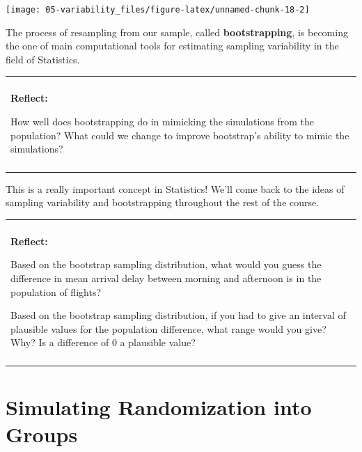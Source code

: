 \documentclass[
]{book}
\newenvironment{Shaded}{\begin{snugshade}}{\end{snugshade}}
\newcommand{\CharTok}[1]{\textcolor[rgb]{0.31,0.60,0.02}{#1}}
\newcommand{\CommentTok}[1]{\textcolor[rgb]{0.56,0.35,0.01}{\textit{#1}}}
\newcommand{\DataTypeTok}[1]{\textcolor[rgb]{0.13,0.29,0.53}{#1}}
\newcommand{\DecValTok}[1]{\textcolor[rgb]{0.00,0.00,0.81}{#1}}
\newcommand{\KeywordTok}[1]{\textcolor[rgb]{0.13,0.29,0.53}{\textbf{#1}}}
\newcommand{\NormalTok}[1]{#1}
\newcommand{\OperatorTok}[1]{\textcolor[rgb]{0.81,0.36,0.00}{\textbf{#1}}}
\newcommand{\StringTok}[1]{\textcolor[rgb]{0.31,0.60,0.02}{#1}}
\newenvironment{reflect}
{
    \begin{center}
    
    \begin{tabular}{|p{0.8\textwidth}|}
    \rowcolor{LightBlue}
    \hline\\
    \rowcolor{LightBlue}
    \textbf{Reflect:}
}
{
    \\\rowcolor{LightBlue}
    \\\hline
    \end{tabular} 
    \end{center}
}
\begin{document}
\begin{Shaded}
\end{Shaded}

\begin{center}\texttt{[image: 05-variability\_files/figure-latex/unnamed-chunk-18-2]} \end{center}

The process of resampling from our sample, called \textbf{bootstrapping}, is becoming the one of main computational tools for estimating sampling variability in the field of Statistics.

\begin{reflect}
How well does bootstrapping do in mimicking the simulations from the
population? What could we change to improve bootstrap's ability to mimic
the simulations?
\end{reflect}

This is a really important concept in Statistics! We'll come back to the ideas of sampling variability and bootstrapping throughout the rest of the course.

\begin{reflect}
Based on the bootstrap sampling distribution, what would you guess the
difference in mean arrival delay between morning and afternoon is in the
population of flights?

Based on the bootstrap sampling distribution, if you had to give an
interval of plausible values for the population difference, what range
would you give? Why? Is a difference of 0 a plausible value?
\end{reflect}

\hypertarget{simulating-randomization-into-groups}{%
\section{Simulating Randomization into Groups}\label{simulating-randomization-into-groups}}
\end{document}
